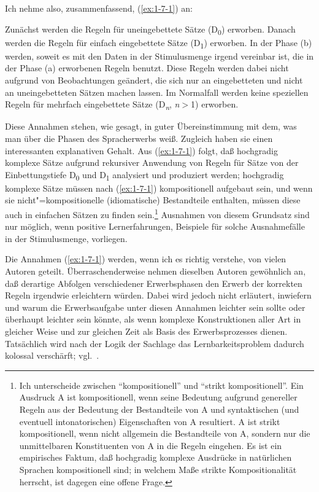 \documentclass[output=paper]{langsci/langscibook}
\begin{document}
Ich nehme also, zusammenfassend, (\ref{ex:1-7-1}) an:
\begin{exe}
\ex\label{ex:1-7-1}
\begin{xlist}
\ex\label{ex:1-7-1a} Zunächst werden die Regeln für uneingebettete Sätze (D\textsubscript{0}) erworben.
\ex\label{ex:1-7-1b} Danach werden die Regeln für einfach eingebettete Sätze (D\textsubscript{1}) erworben.
\ex\label{ex:1-7-1c} In der Phase (b) werden, soweit es mit den Daten in der Stimulusmenge irgend vereinbar ist, die in der Phase (a) erworbenen Regeln benutzt.
\ex\label{ex:1-7-1d} Diese Regeln werden dabei nicht aufgrund von Beobachtungen geändert,
die sich nur an eingebetteten und nicht an uneingebetteten Sätzen machen
lassen.
\ex\label{ex:1-7-1e} Im Normalfall werden keine speziellen Regeln für mehrfach eingebettete
Sätze (D\textsubscript{\emph{n}}, \emph{n}$>$1) erworben.
\end{xlist}
\end{exe}
Diese Annahmen stehen, wie gesagt, in guter Übereinstimmung mit dem, was man über die Phasen des
Spracherwerbs weiß. Zugleich haben sie einen interessanten explanativen Gehalt. Aus (\ref{ex:1-7-1})
folgt, daß hochgradig komplexe Sätze aufgrund rekursiver Anwendung von Regeln für Sätze von der
Einbettungstiefe D\textsubscript{0} und D\textsubscript{1} analysiert und produziert werden;
hochgradig komplexe Sätze müssen nach (\ref{ex:1-7-1}) kompositionell aufgebaut sein, und wenn sie
nicht"=kompositionelle (idiomatische) Bestandteile enthalten, müssen diese auch in einfachen Sätzen
zu finden sein.\footnote{%
  Ich unterscheide zwischen "`kompositionell"' und "`strikt kompositionell"'. Ein Ausdruck A ist
  kompositionell, wenn seine Bedeutung aufgrund genereller Regeln aus der Bedeutung der Bestandteile
  von A und syntaktischen (und eventuell intonatorischen) Eigenschaften von A resultiert. A ist
  strikt kompositionell, wenn nicht allgemein die Bestandteile von A, sondern nur die unmittelbaren
  Konstituenten von A in die Regeln eingehen. Es ist ein empirisches Faktum, daß hochgradig komplexe
  Ausdrücke in natürlichen Sprachen kompositionell sind; in welchem Maße strikte Kompositionalität
  herrscht, ist dagegen eine offene Frage.%
}
Ausnahmen von diesem Grundsatz sind nur möglich, wenn positive Lernerfahrungen, \dash Beispiele für solche Ausnahmefälle in der Stimulusmenge, vorliegen.

\ssubsubsection{}%
\label{subsubsec:1-7.2.3}

\addlines[2]%
Die Annahmen (\ref{ex:1-7-1}) werden, wenn ich es richtig verstehe, von vielen Autoren
geteilt. Überraschenderweise nehmen dieselben Autoren gewöhnlich an, daß derartige Abfolgen verschiedener Erwerbsphasen den Erwerb der korrekten Regeln irgendwie erleichtern würden. Dabei wird jedoch nicht erläutert, inwiefern und warum die Erwerbsaufgabe unter diesen Annahmen leichter sein sollte oder überhaupt
leichter sein könnte, als wenn komplexe Konstruktionen aller Art in gleicher Weise
und zur gleichen Zeit als Basis des Erwerbsprozesses dienen. Tatsächlich wird nach
der Logik der Sachlage das Lernbarkeitsproblem dadurch kolossal verschärft; vgl.\
\citet[§2.7.3]{WexlerCulicover1980}.
\end{document}
